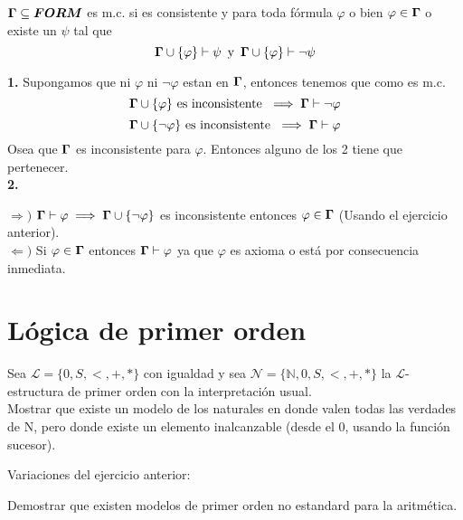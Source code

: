 \documentclass[leqno, 12pt, twoside,letterpaper]{book}
\begin{document}
\begin{solucion}
\begin{defi}
$\bm{\Gamma} \subseteq \bm{FORM}$ es m.c. si es consistente y para toda fórmula $\varphi$ o bien $\varphi \in \bm{\Gamma}$ o existe un $\psi$ tal que
\[\bm{\Gamma} \cup \{ \varphi \} \vdash \psi \mbox{\, y\, }  \bm{\Gamma} \cup \{ \varphi \} \vdash \lnot\psi\]
\end{defi}


\noindent\textbf{1.} Supongamos que ni $\varphi$ ni $\lnot\varphi$ estan en $\bm{\Gamma}$, entonces tenemos que como es m.c.
	\[ \bm{\Gamma} \cup \{ \varphi \} \mbox{ es inconsistente } \implies \bm{\Gamma} \vdash \lnot\varphi \]
	\[ \bm{\Gamma} \cup \{ \lnot\varphi \} \mbox{ es inconsistente } \implies \bm{\Gamma} \vdash \varphi \]
Osea que $\bm{\Gamma}$ es inconsistente para $\varphi$. Entonces alguno de los 2 tiene que pertenecer. \\

\noindent\textbf{2.}
\begin{dem}
$\Rightarrow)$ $\bm{\Gamma} \vdash \varphi \implies \bm{\Gamma} \cup \{ \lnot\varphi \}$ es inconsistente entonces $\varphi \in \bm{\Gamma}$ (Usando el ejercicio anterior). \\
\noindent $\Leftarrow)$ Si $\varphi \in \bm{\Gamma} $ entonces $\bm{\Gamma} \vdash \varphi$ ya que $\varphi$ es axioma o está por consecuencia inmediata.
\end{dem}

\end{solucion}




\section*{Lógica de primer orden}

\begin{ej}{8}
    Sea $\bm{\mathcal{L}} = \{0, S, <, +, *\}$ con igualdad y sea
    $\bm{\mathcal{N}} = \{\mathbb{N},
    0, S, <, +, *\}$ la $\bm{\mathcal{L}}$-estructura de primer orden con la
    interpretación usual. \\ Mostrar que existe un modelo de los naturales en donde
    valen todas las verdades de N, pero donde existe un elemento inalcanzable
    (desde el 0, usando la función sucesor).
\end{ej}

\noindent Variaciones del ejercicio anterior:

\begin{ej}{1}
    Demostrar que existen modelos de primer orden no estandard para la
    aritmética.
\end{ej}
\end{document}
